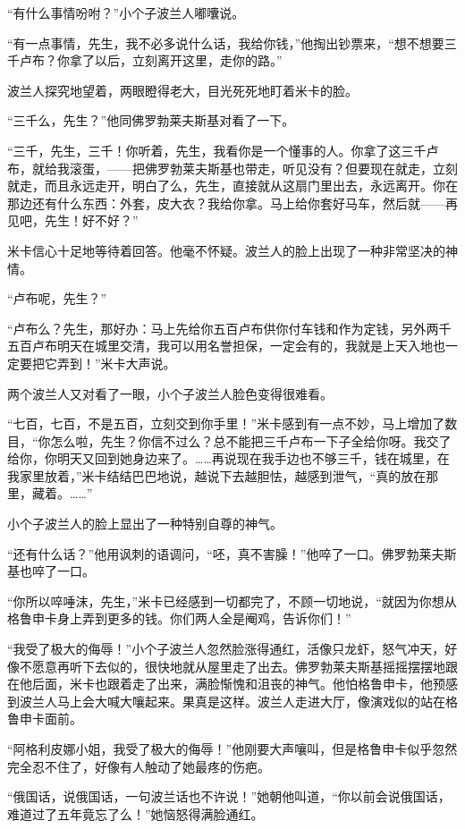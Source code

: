 \par “有什么事情吩咐？”小个子波兰人嘟囔说。
\par “有一点事情，先生，我不必多说什么话，我给你钱，”他掏出钞票来，“想不想要三千卢布？你拿了以后，立刻离开这里，走你的路。”
\par 波兰人探究地望着，两眼瞪得老大，目光死死地盯着米卡的脸。
\par “三千么，先生？”他同佛罗勃莱夫斯基对看了一下。
\par “三千，先生，三千！你听着，先生，我看你是一个懂事的人。你拿了这三千卢布，就给我滚蛋，——把佛罗勃莱夫斯基也带走，听见没有？但要现在就走，立刻就走，而且永远走开，明白了么，先生，直接就从这扇门里出去，永远离开。你在那边还有什么东西：外套，皮大衣？我给你拿。马上给你套好马车，然后就——再见吧，先生！好不好？”
\par 米卡信心十足地等待着回答。他毫不怀疑。波兰人的脸上出现了一种非常坚决的神情。
\par “卢布呢，先生？”
\par “卢布么？先生，那好办：马上先给你五百卢布供你付车钱和作为定钱，另外两千五百卢布明天在城里交清，我可以用名誉担保，一定会有的，我就是上天入地也一定要把它弄到！”米卡大声说。
\par 两个波兰人又对看了一眼，小个子波兰人脸色变得很难看。
\par “七百，七百，不是五百，立刻交到你手里！”米卡感到有一点不妙，马上增加了数目，“你怎么啦，先生？你信不过么？总不能把三千卢布一下子全给你呀。我交了给你，你明天又回到她身边来了。……再说现在我手边也不够三千，钱在城里，在我家里放着，”米卡结结巴巴地说，越说下去越胆怯，越感到泄气，“真的放在那里，藏着。……”
\par 小个子波兰人的脸上显出了一种特别自尊的神气。
\par “还有什么话？”他用讽刺的语调问，“呸，真不害臊！”他啐了一口。佛罗勃莱夫斯基也啐了一口。
\par “你所以啐唾沫，先生，”米卡已经感到一切都完了，不顾一切地说，“就因为你想从格鲁申卡身上弄到更多的钱。你们两人全是阉鸡，告诉你们！”
\par “我受了极大的侮辱！”小个子波兰人忽然脸涨得通红，活像只龙虾，怒气冲天，好像不愿意再听下去似的，很快地就从屋里走了出去。佛罗勃莱夫斯基摇摇摆摆地跟在他后面，米卡也跟着走了出来，满脸惭愧和沮丧的神气。他怕格鲁申卡，他预感到波兰人马上会大喊大嚷起来。果真是这样。波兰人走进大厅，像演戏似的站在格鲁申卡面前。
\par “阿格利皮娜小姐，我受了极大的侮辱！”他刚要大声嚷叫，但是格鲁申卡似乎忽然完全忍不住了，好像有人触动了她最疼的伤疤。
\par “俄国话，说俄国话，一句波兰话也不许说！”她朝他叫道，“你以前会说俄国话，难道过了五年竟忘了么！”她恼怒得满脸通红。
